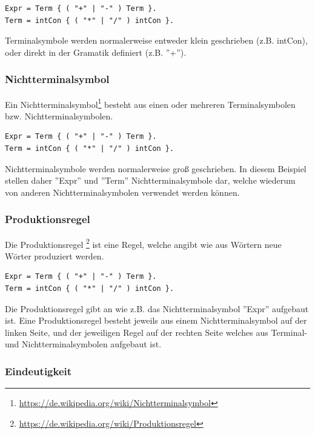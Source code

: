 \begin{lstlisting}[language=EBNF]
Expr = Term { ( "+" | "-" ) Term }.
Term = intCon { ( "*" | "/" ) intCon }.
\end{lstlisting}

Terminalsymbole werden normalerweise entweder klein geschrieben (z.B. intCon), oder direkt in der Gramatik definiert (z.B. ''+'').

\subsubsection{Nichtterminalsymbol}

Ein Nichtterminalsymbol\footnote{\url{https://de.wikipedia.org/wiki/Nichtterminalsymbol}} besteht aus einen oder mehreren Terminalsymbolen bzw. Nichtterminalsymbolen.

\begin{lstlisting}[language=EBNF]
Expr = Term { ( "+" | "-" ) Term }.
Term = intCon { ( "*" | "/" ) intCon }.
\end{lstlisting}

Nichtterminalsymbole werden normalerweise gro\ss{} geschrieben. In diesem Beispiel stellen daher ''Expr'' und ''Term'' Nichtterminalsymbole dar, welche wiederum von anderen Nichtterminalsymbolen verwendet werden k\"onnen.

\subsubsection{Produktionsregel}

Die Produktionsregel \footnote{\url{https://de.wikipedia.org/wiki/Produktionsregel}} ist eine Regel, welche angibt wie aus W\"ortern neue W\"orter produziert werden.

\begin{lstlisting}[language=EBNF]
Expr = Term { ( "+" | "-" ) Term }.
Term = intCon { ( "*" | "/" ) intCon }.
\end{lstlisting}

Die Produktionsregel gibt an wie z.B. das Nichtterminalsymbol ''Expr'' aufgebaut ist. Eine Produktionsregel besteht jeweils aus einem Nichtterminalsymbol auf der linken Seite, und der jeweiligen Regel auf der rechten Seite welches aus Terminal- und Nichtterminalsymbolen aufgebaut ist.

\newpage

\subsubsection{Eindeutigkeit}

